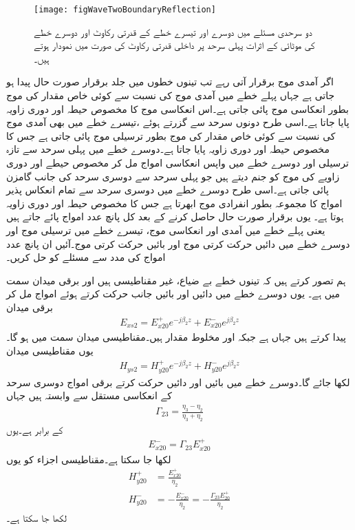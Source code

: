 \begin{figure}
\centering
\texttt{[image: figWaveTwoBoundaryReflection]}
\caption{دو سرحدی  مسئلے میں دوسرے اور تیسرے خطے کے قدرتی رکاوٹ اور دوسرے خطے کی موٹائی کے اثرات پہلی سرحد پر داخلی قدرتی رکاوٹ کی صورت میں نمودار ہوتے ہیں۔}
\label{شکل_مستوی_دو_سرحد_مسئلہ}
\end{figure}

اگر آمدی موج برقرار آتی رہے  تب تینوں خطوں میں جلد برقرار صورت حال پیدا ہو جاتی ہے جہاں پہلے خطے میں آمدی موج کی نسبت سے کوئی خاص مقدار کی موج بطور انعکاسی موج پائی جاتی ہے۔اس انعکاسی موج کا مخصوص حیطہ اور دوری زاویہ پایا جاتا ہے۔اسی طرح دونوں سرحد سے گزرتے ہوئے ،تیسرے خطے میں بھی آمدی موج کی نسبت سے کوئی خاص مقدار کی موج بطور ترسیلی موج پائی جاتی ہے جس کا مخصوص حیطہ اور دوری زاویہ پایا جاتا ہے۔دوسرے خطے میں پہلی سرحد سے تازہ ترسیلی اور دوسرے خطے میں واپس انعکاسی امواج مل کر مخصوص حیطے اور دوری زاویے کی موج کو جنم دیتے ہیں جو پہلی سرحد سے دوسری سرحد کی جانب گامزن پائی جاتی ہے۔اسی طرح دوسرے خطے میں دوسری سرحد سے تمام انعکاس پذیر امواج کا مجموعہ بطور انفرادی موج ابھرتا ہے جس کا مخصوص حیطہ اور دوری زاویہ ہوتا ہے۔ یوں برقرار صورت حال حاصل کرنے کے بعد کل پانچ عدد امواج پائے جاتے ہیں یعنی پہلے خطے میں آمدی اور انعکاسی موج، تیسرے خطے میں ترسیلی موج اور دوسرے خطے میں دائیں حرکت کرتی موج اور بائیں حرکت کرتی موج۔آئیں ان پانچ عدد امواج کی مدد سے مسئلے کو حل کریں۔

ہم تصور کرتے ہیں کہ تینوں خطے بے ضیاع، غیر مقناطیسی ہیں اور برقی میدان  سمت میں ہے۔ یوں دوسرے خطے میں دائیں اور بائیں جانب حرکت کرتے ہوئے امواج مل کر برقی میدان 
\begin{align}
E_{xs2}=E_{x20}^+ e^{-j\beta_2 z}+E_{x20}^- e^{j \beta_2 z}
\end{align}
پیدا کرتے ہیں جہاں  ہے جبکہ  اور  مخلوط مقدار ہیں۔مقناطیسی میدان  سمت میں ہو گا۔یوں مقناطیسی میدان
\begin{align}
H_{ys2}=H_{y20}^+ e^{-j\beta_2 z}+H_{y20}^- e^{j \beta_2 z}
\end{align}
لکھا جائے گا۔دوسرے خطے میں بائیں اور دائیں حرکت کرتے برقی امواج دوسری سرحد کے انعکاسی مستقل  سے وابستہ ہیں جہاں
\begin{align}\label{مساوات_مستوی_دو_سرحد_انعکاسی_مستقل_دو}
\Gamma_{23}=\frac{\eta_3-\eta_2}{\eta_3+\eta_2}
\end{align}
کے برابر ہے۔یوں
\begin{align}\label{مساوات_مستوی_دو_سرحد_برقی_دو}
E_{x20}^-=\Gamma_{23} E_{x20}^+
\end{align}
لکھا جا سکتا ہے۔مقناطیسی اجزاء کو یوں 
\begin{align}\label{مساوات_مستوی_دو_سرحد_مقناطیسی_دو}
H_{y20}^+&=\frac{E_{x20}^+}{\eta_2}\\
H_{y20}^-&=-\frac{E_{x20}^-}{\eta_2}=-\frac{\Gamma_{23} E_{20}^+}{\eta_2}
\end{align}
لکھا جا سکتا ہے۔


